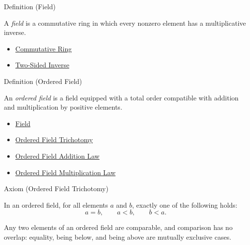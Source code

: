 \begin{definitionbox}{Definition (Field)}
\begin{definition}[Field]
\label{def:abstract-field}
A \emph{field} is a commutative ring in which every nonzero element has a
multiplicative inverse.
\end{definition}
\end{definitionbox}

\begin{dependencies}
\begin{itemize}
  \item \hyperref[def:commutative-ring]{Commutative Ring}
  \item \hyperref[def:two-sided-inverse]{Two-Sided Inverse}
\end{itemize}
\end{dependencies}

\begin{definitionbox}{Definition (Ordered Field)}
\begin{definition}
\label{def:abstract-ordered-field}
An \emph{ordered field} is a field equipped with a total order compatible with
addition and multiplication by positive elements.
\end{definition}
\end{definitionbox}

\begin{dependencies}
\begin{itemize}
  \item \hyperref[def:abstract-field]{Field}
  \item \hyperref[ax:ordered-field-trichotomy]{Ordered Field Trichotomy}
  \item \hyperref[ax:ordered-field-addition-law]{Ordered Field Addition Law}
  \item \hyperref[ax:ordered-field-multiplication-law]{Ordered Field Multiplication Law}
\end{itemize}
\end{dependencies}

\begin{axiombox}{Axiom (Ordered Field Trichotomy)}
\begin{axiom}
\label{ax:ordered-field-trichotomy}
In an ordered field, for all elements $a$ and $b$, exactly one of the following
holds:
\[
a=b,\qquad a<b,\qquad b<a.
\]
\end{axiom}
\end{axiombox}

\begin{remark*}[Interpretation]
Any two elements of an ordered field are comparable, and comparison has no
overlap: equality, being below, and being above are mutually exclusive cases.
\end{remark*}

